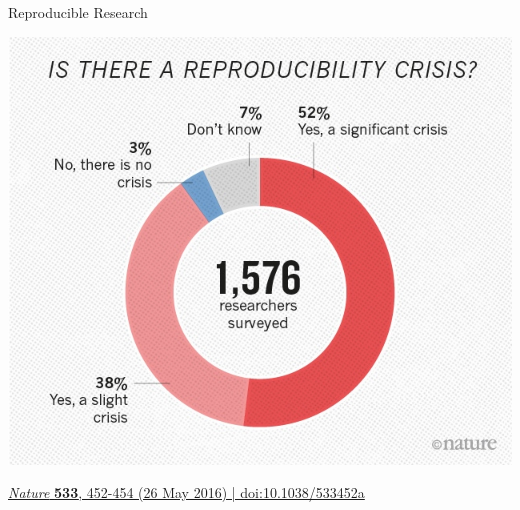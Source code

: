 \documentclass{beamer}
\begin{document}
\begin{frame}[noframenumbering]{Reproducible Research}
\begin{center}
\includegraphics[width=.82\textwidth]{nature-reproducibility-graphic.jpeg}
\end{center}
\vspace{-0.5cm}
{\footnotesize \href{https://www.nature.com/news/1-500-scientists-lift-the-lid-on-reproducibility-1.19970}{\textit{Nature} \textbf{533}, 452-454 (26 May 2016) | doi:10.1038/533452a}}
\vfill
\end{frame}
\end{document}
